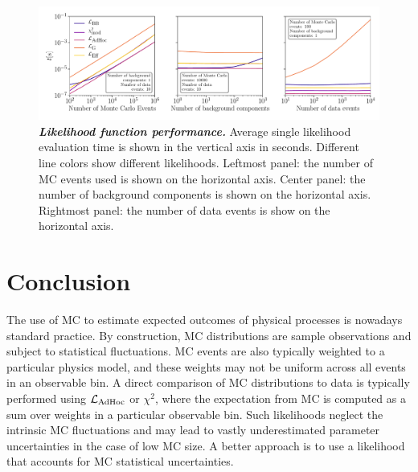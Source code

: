 \documentclass[a4paper, 11pt]{article}
\newcommand{\adhoc}{\mathcal{L}_{\textmd{AdHoc}}}
\begin{document}
\begin{figure}[ht]
\centering
    \includegraphics[width=1\linewidth]{fig/fig7_multi_panel}
\caption{\textbf{\textit{Likelihood function performance.}} Average single likelihood evaluation time is shown in the vertical axis in seconds. Different line colors show different likelihoods. Leftmost panel: the number of MC events used is shown on the horizontal axis. Center panel: the number of background components is shown on the horizontal axis. Rightmost panel: the number of data events is show on the horizontal axis.}
\label{fig:performance}
\end{figure}

\section{Conclusion\label{sec:conclusion}}

The use of MC to estimate expected outcomes of physical processes is nowadays standard practice. By construction, MC distributions are sample observations and subject to statistical fluctuations. MC events are also typically weighted to a particular physics model, and these weights may not be uniform across all events in an observable bin.
A direct comparison of MC distributions to data is typically performed using $\adhoc$ or $\chi^2$, where the expectation from MC is computed as a sum over weights in a particular observable bin. Such likelihoods neglect the intrinsic MC fluctuations and may lead to vastly underestimated parameter uncertainties in the case of low MC size. A better approach is to use a likelihood that accounts for MC statistical uncertainties.
\end{document}
